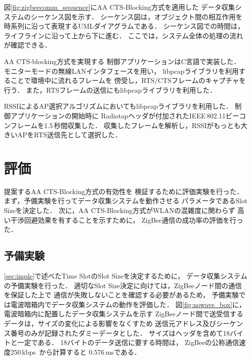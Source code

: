 \documentclass[12pt]{jreport}
\begin{document}
図\ref{fig:zigbeecomm_sequence}にAA CTS-Blocking方式を適用した
データ収集システムのシーケンス図を示す．
シーケンス図は，オブジェクト間の相互作用を時系列に沿って表現するUMLダイアグラムである．
シーケンス図での時間は，ライフラインに沿って上から下に進む．
ここでは，システム全体の処理の流れが確認できる．

AA CTS-blocking方式を実現する
制御アプリケーションはC言語で実装した．
モニターモードの無線LANインタフェースを用い，
libpcapライブラリを利用することで環境中に流れるフレームを
傍受し，RTS/CTSフレームのキャプチャを行う．
また，RTSフレームの送信にもlibpcapライブラリを利用した．

RSSIによるAP選択アルゴリズムにおいてもlibpcapライブラリを利用した．
制御アプリケーションの開始時に
Radiotapヘッダが付加されたIEEE\,802.11ビーコンフレームを1.5\,秒間収集した．
収集したフレームを解析し，RSSIがもっとも大きいAPをRTS送信先として選択した．


\chapter{評価}
\label{eval}

提案するAA CTS-Blocking方式の有効性を
検証するために評価実験を行った．
まず，予備実験を行ってデータ収集システムを動作させる
パラメータであるSlot Sizeを決定した．
次に，AA CTS-Blocking方式がWLANの混雑度に関わらず
高い干渉回避効果を有することを示すために，
ZigBee通信の成功率の評価を行った．

\section{予備実験}
\label{ssec:before_exp}

\ref{sec:imple}で述べたTime SlotのSlot Sizeを決定するために，
データ収集システムの予備実験を行った．
適切なSlot Size決定に向けては，ZigBeeノード間の通信を保証した上で
通信が失敗しないことを確認する必要があるため，
予備実験では電波暗箱内でデータ収集システムの動作を評価した．
図\ref{fig:nowave_box}に，電波暗箱内に配置したデータ収集システムを示す
ZigBeeノード間で送受信するデータは，サイズの変化による影響をなくすため
送信元アドレス及びシーケンス番号のみが記録されたダミーデータとした．
サイズはヘッダを含めて18バイトと一定である．
18バイトのデータ送信に要する時間は，
ZigBeeの公称通信速度250\,kbps~\cite{IEEE802_15_4-2006}から計算すると
0.576\,msである．
\end{document}

